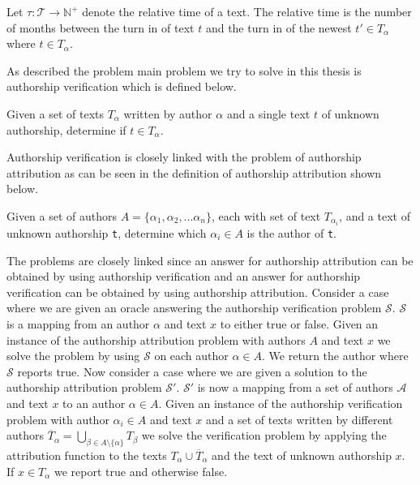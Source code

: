 \begin{definition}
    \label{def:text_relative_time}

    Let $\tau \colon \mathcal{T} \rightarrow \mathbb{N}^+$ denote the relative
    time of a text. The relative time is the number of months between the turn
    in of text $t$ and the turn in of the newest $t' \in T_\alpha$ where $t \in
    T_\alpha$.

\end{definition}


As described the problem main problem we try to solve in this thesis is
authorship verification which is defined below.

\begin{definition}
    \label{def:authorship_verification}

    Given a set of texts $T_\alpha$ written by author $\alpha$ and a single
    text $t$ of unknown authorship, determine if $t \in T_\alpha$.

\end{definition}

Authorship verification is closely linked with the problem of authorship
attribution as can be seen in the definition of authorship attribution shown
below.

\begin{definition}

    Given a set of authors $A = \{\alpha_1, \alpha_2,...\alpha_n\}$, each with
    set of text $T_{\alpha_i}$, and a text of unknown authorship \texttt{t},
    determine which $\alpha_i \in A$ is the author of \texttt{t}.

\end{definition}

The problems are closely linked since an answer for authorship attribution
can be obtained by using authorship verification and an answer for authorship
verification can be obtained by using authorship attribution. Consider a case
where we are given an oracle answering the authorship verification problem
$\mathcal{S}$. $\mathcal{S}$ is a mapping from an author $\alpha$ and text $x$
to either true or false. Given an instance of the authorship attribution problem
with authors $A$ and text $x$ we solve the problem by using $\mathcal{S}$ on
each author $\alpha \in A$. We return the author where $\mathcal{S}$ reports
true. Now consider a case where we are given a solution to the authorship
attribution problem $\mathcal{S}'$. $\mathcal{S}'$ is now a mapping from a set
of authors $\mathcal{A}$ and text $x$ to an author $\alpha \in A$. Given an
instance of the authorship verification problem with author $\alpha_i \in A$ and
text $x$ and a set of texts written by different authors $\overline{T}_{\alpha}
= \bigcup_{\beta \in A \setminus \{\alpha\}} T_\beta$ we solve the verification
problem by applying the attribution function to the texts $T_{\alpha} \cup
\overline{T}_{\alpha}$ and the text of unknown authorship $x$. If $x \in
T_{\alpha}$ we report true and otherwise false.
